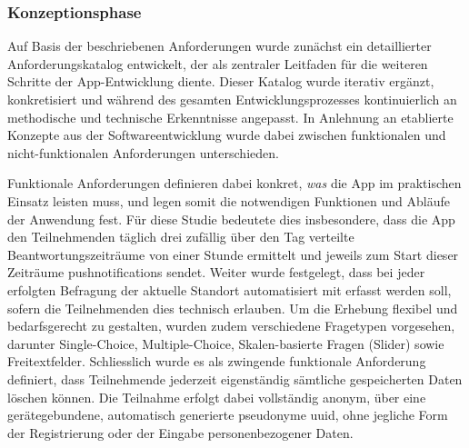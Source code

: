 \subsubsection{Konzeptionsphase}
Auf Basis der beschriebenen Anforderungen wurde zunächst ein detaillierter Anforderungskatalog entwickelt, der als zentraler Leitfaden für die weiteren Schritte der App-Entwicklung diente. Dieser Katalog wurde iterativ ergänzt, konkretisiert und während des gesamten Entwicklungsprozesses kontinuierlich an methodische und technische Erkenntnisse angepasst. In Anlehnung an etablierte Konzepte aus der Softwareentwicklung wurde dabei zwischen funktionalen und nicht-funktionalen Anforderungen unterschieden.

Funktionale Anforderungen definieren dabei konkret, \textit{was} die App im praktischen Einsatz leisten muss, und legen somit die notwendigen Funktionen und Abläufe der Anwendung fest. Für diese Studie bedeutete dies insbesondere, dass die App den Teilnehmenden täglich drei zufällig über den Tag verteilte Beantwortungszeiträume von einer Stunde ermittelt und jeweils zum Start dieser Zeiträume \glspl{pushnotification} sendet. Weiter wurde festgelegt, dass bei jeder erfolgten Befragung der aktuelle Standort automatisiert mit erfasst werden soll, sofern die Teilnehmenden dies technisch erlauben. Um die Erhebung flexibel und bedarfsgerecht zu gestalten, wurden zudem verschiedene Fragetypen vorgesehen, darunter Single-Choice, Multiple-Choice, Skalen-basierte Fragen (Slider) sowie Freitextfelder. Schliesslich wurde es als zwingende funktionale Anforderung definiert, dass Teilnehmende jederzeit eigenständig sämtliche gespeicherten Daten löschen können. Die Teilnahme erfolgt dabei vollständig anonym, über eine gerätegebundene, automatisch generierte pseudonyme \gls{uuid}, ohne jegliche Form der Registrierung oder der Eingabe personenbezogener Daten.

